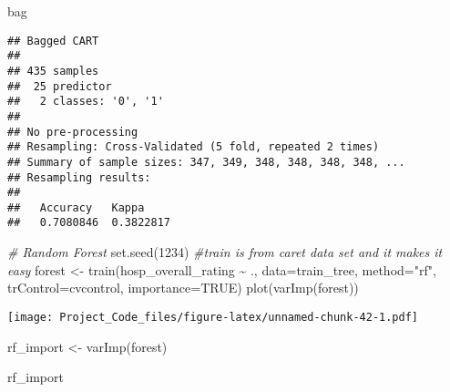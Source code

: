 \documentclass[
]{article}
\newenvironment{Shaded}{\begin{snugshade}}{\end{snugshade}}
\newcommand{\AttributeTok}[1]{\textcolor[rgb]{0.77,0.63,0.00}{#1}}
\newcommand{\CommentTok}[1]{\textcolor[rgb]{0.56,0.35,0.01}{\textit{#1}}}
\newcommand{\ConstantTok}[1]{\textcolor[rgb]{0.00,0.00,0.00}{#1}}
\newcommand{\DecValTok}[1]{\textcolor[rgb]{0.00,0.00,0.81}{#1}}
\newcommand{\FunctionTok}[1]{\textcolor[rgb]{0.00,0.00,0.00}{#1}}
\newcommand{\NormalTok}[1]{#1}
\newcommand{\OtherTok}[1]{\textcolor[rgb]{0.56,0.35,0.01}{#1}}
\newcommand{\SpecialCharTok}[1]{\textcolor[rgb]{0.00,0.00,0.00}{#1}}
\newcommand{\StringTok}[1]{\textcolor[rgb]{0.31,0.60,0.02}{#1}}
\begin{document}
\begin{Shaded}
\begin{Highlighting}[]
\NormalTok{bag}
\end{Highlighting}
\end{Shaded}

\begin{verbatim}
## Bagged CART 
## 
## 435 samples
##  25 predictor
##   2 classes: '0', '1' 
## 
## No pre-processing
## Resampling: Cross-Validated (5 fold, repeated 2 times) 
## Summary of sample sizes: 347, 349, 348, 348, 348, 348, ... 
## Resampling results:
## 
##   Accuracy   Kappa    
##   0.7080846  0.3822817
\end{verbatim}

\begin{Shaded}
\end{Shaded}

\begin{Shaded}
\begin{Highlighting}[]
\CommentTok{\# Random Forest}
\FunctionTok{set.seed}\NormalTok{(}\DecValTok{1234}\NormalTok{) }
\CommentTok{\#train is from caret data set and it makes it easy}
\NormalTok{forest }\OtherTok{\textless{}{-}} \FunctionTok{train}\NormalTok{(hosp\_overall\_rating }\SpecialCharTok{\textasciitilde{}}\NormalTok{ ., }
             \AttributeTok{data=}\NormalTok{train\_tree,}
             \AttributeTok{method=}\StringTok{"rf"}\NormalTok{,}
             \AttributeTok{trControl=}\NormalTok{cvcontrol,}
             \AttributeTok{importance=}\ConstantTok{TRUE}\NormalTok{)}
\FunctionTok{plot}\NormalTok{(}\FunctionTok{varImp}\NormalTok{(forest))}
\end{Highlighting}
\end{Shaded}

\texttt{[image: Project\_Code\_files/figure-latex/unnamed-chunk-42-1.pdf]}

\begin{Shaded}
\begin{Highlighting}[]
\NormalTok{rf\_import }\OtherTok{\textless{}{-}} \FunctionTok{varImp}\NormalTok{(forest)}

\NormalTok{rf\_import}
\end{Highlighting}
\end{Shaded}
\end{document}
